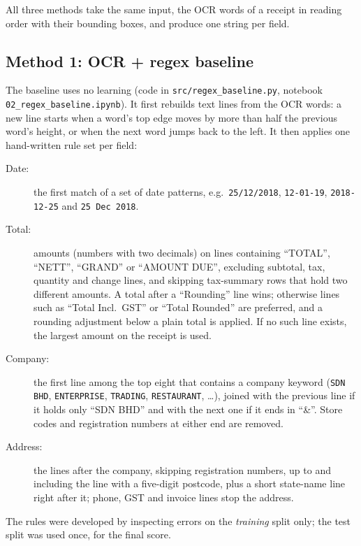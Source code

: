 
All three methods take the same input, the OCR words of a receipt in
reading order with their bounding boxes, and produce one string per
field.

\subsection{Method 1: OCR + regex baseline}
\label{sec:regex}

The baseline uses no learning (code in \texttt{src/regex\_baseline.py},
notebook \texttt{02\_regex\_baseline.ipynb}). It first rebuilds text
lines from the OCR words: a new line starts when a word's top edge moves
by more than half the previous word's height, or when the next word
jumps back to the left. It then applies one hand-written rule set per
field:

\begin{description}
  \item[Date:] the first match of a set of date patterns, e.g.\
        \texttt{25/12/2018}, \texttt{12-01-19}, \texttt{2018-12-25} and
        \texttt{25 Dec 2018}.
  \item[Total:] amounts (numbers with two decimals) on lines containing
        ``TOTAL'', ``NETT'', ``GRAND'' or ``AMOUNT DUE'', excluding
        subtotal, tax, quantity and change lines, and skipping
        tax-summary rows that hold two different amounts. A total after
        a ``Rounding'' line wins; otherwise lines such as ``Total Incl.\
        GST'' or ``Total Rounded'' are preferred, and a rounding
        adjustment below a plain total is applied. If no such line
        exists, the largest amount on the receipt is used.
  \item[Company:] the first line among the top eight that contains a
        company keyword (\texttt{SDN BHD}, \texttt{ENTERPRISE},
        \texttt{TRADING}, \texttt{RESTAURANT}, \ldots), joined with the
        previous line if it holds only ``SDN BHD'' and with the next one
        if it ends in ``\&''. Store codes and registration numbers at
        either end are removed.
  \item[Address:] the lines after the company, skipping registration
        numbers, up to and including the line with a five-digit
        postcode, plus a short state-name line right after it; phone,
        GST and invoice lines stop the address.
\end{description}

The rules were developed by inspecting errors on the \emph{training}
split only; the test split was used once, for the final score.
